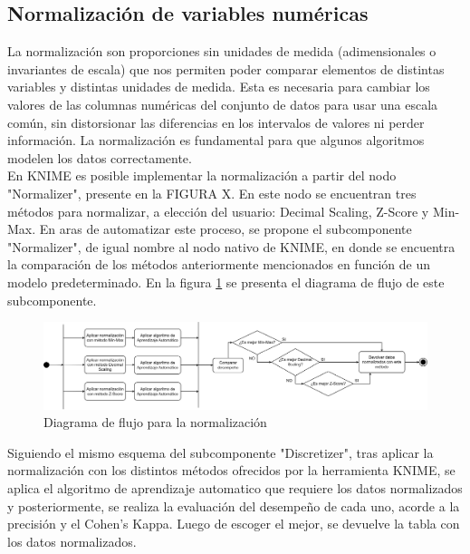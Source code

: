 \subsection{Normalización de variables numéricas}
La normalización son proporciones sin unidades de medida (adimensionales o invariantes de escala) que nos permiten poder comparar elementos de distintas variables y distintas unidades de medida. Esta es necesaria para cambiar los valores de las columnas numéricas del conjunto de datos para usar una escala común, sin distorsionar las diferencias en los intervalos de valores ni perder información. La normalización es fundamental para que algunos algoritmos modelen los datos correctamente. \\
En KNIME es posible implementar la normalización a partir del nodo "Normalizer", presente en la FIGURA X. En este nodo se encuentran tres métodos para normalizar, a elección del usuario: Decimal Scaling, Z-Score y Min-Max. En aras de automatizar este proceso, se propone el subcomponente "Normalizer", de igual nombre al nodo nativo de KNIME, en donde se encuentra la comparación de los métodos anteriormente mencionados en función de un modelo predeterminado. En la figura \ref{fig:normalizacion} se presenta el diagrama de flujo de este subcomponente. 

\begin{figure}[H]
	\centering
	\includegraphics[width=1\linewidth]{"figuras/capi 2/preprocesado/normalizacion.drawio"}
	\caption{Diagrama de flujo para la normalización}
	\label{fig:normalizacion}
\end{figure}

Siguiendo el mismo esquema del subcomponente "Discretizer", tras aplicar la normalización con los distintos métodos ofrecidos por la herramienta KNIME, se aplica el algoritmo de aprendizaje automatico que requiere los datos normalizados y posteriormente, se realiza la evaluación del desempeño de cada uno, acorde a la precisión y el Cohen's Kappa. Luego de escoger el mejor, se devuelve la tabla con los datos normalizados.


